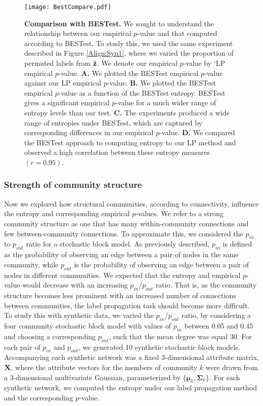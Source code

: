 \begin{figure}
\centering
\begin{center}
\texttt{[image: BestCompare.pdf]}
\caption{{\bf Comparison with BESTest.} We sought to understand the relationship between our empirical $p$-value and that computed according to BESTest. To study this, we used the same experiment described in Figure \ref{Align:Syn1}, where we varied the proportion of permuted labels from $\tilde{\bf z}$. We denote our empirical $p$-value by `LP empirical $p$-value. {\bf A.} We plotted the BESTest empirical $p$-value against our LP empirical $p$-value. {\bf B.} We plotted the BESTest empirical $p$-value as a function of the BESTest entropy. BESTest gives a significant empirical $p$-value for a much wider range of entropy levels than our test. {\bf C.} The experiments produced a wide range of entropies under BESTest, which are captured by corresponding differences in our empirical $p$-value. {\bf D.} We compared the BESTest approach to computing entropy to our LP method and observed a high correlation between these entropy measures $(r=0.95)$. }
\label{BestCompare}
\end{center}
\end{figure}


\subsubsection{Strength of community structure} Now we explored how structural communities, according to connectivity, influence the entropy and corresponding empirical $p$-values. We refer to a strong community structure as one that has many within-community connections and few between-community connections. To approximate this, we considered the $p_{in}$ to $p_{out}$ ratio for a stochastic block model. As previously described, $p_{in}$ is defined as the probability of observing an edge between a pair of nodes in the same community, while $p_{out}$ is the probability of observing an edge between a pair of nodes in different communities. We expected that the entropy and empirical $p$-value would decrease with an increasing $p_{in}/p_{out}$ ratio. That is, as the community structure becomes less prominent with an increased number of connections between communities, the label propagation task should become more difficult. To study this with synthetic data, we varied the $p_{in}/p_{out}$ ratio, by considering a four community stochastic block model with values of $p_{in}$ between 0.05 and 0.45 and choosing a corresponding $p_{out}$, such that the mean degree was equal 30.  For each pair of $p_{in}$ and $p_{out}$, we generated 10 synthetic stochastic block models. Accompanying each synthetic network was a fixed 3-dimensional attribute matrix, ${\bf X}$, where the attribute vectors for the members of community $k$ were drawn from a 3-dimensional multivariate Gaussian, parameterized by $\{{\boldsymbol \mu}_{k},{\boldsymbol \Sigma}_{k}\}$. For each synthetic network, we computed the entropy under our label propagation method and the corresponding $p$-value. 

